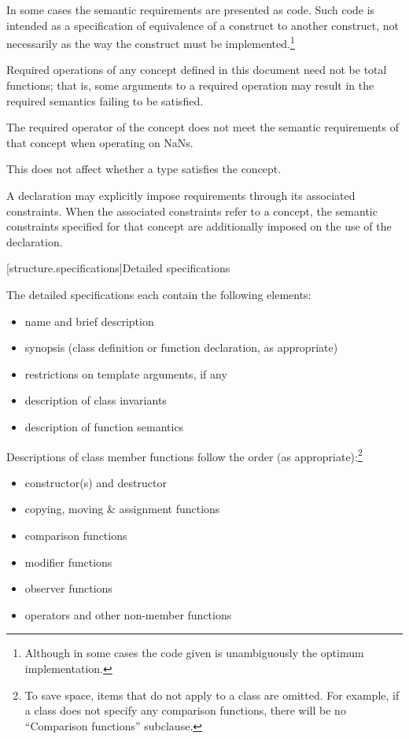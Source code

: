 \pnum
In some cases the semantic requirements are presented as \Cpp{} code.
Such code is intended as a
specification of equivalence of a construct to another construct, not
necessarily as the way the construct
must be implemented.\footnote{Although in some cases the code given is
unambiguously the optimum implementation.}

\pnum
Required operations of any concept defined in this document need not be
total functions; that is, some arguments to a required operation may
result in the required semantics failing to be satisfied.
\begin{example}
The required \tcode{<} operator of the 
concept does not meet the
semantic requirements of that concept when operating on NaNs.
\end{example}
This does not affect whether a type satisfies the concept.

\pnum
A declaration may explicitly impose requirements through its associated
constraints. When the associated constraints refer to a
concept, the semantic constraints specified for that concept
are additionally imposed on the use of the declaration.

[structure.specifications]{Detailed specifications}

\pnum
The detailed specifications each contain the following elements:%

\begin{itemize}
\item name and brief description
\item synopsis (class definition or function declaration, as appropriate)
\item restrictions on template arguments, if any
\item description of class invariants
\item description of function semantics
\end{itemize}

\pnum
Descriptions of class member functions follow the order (as
appropriate):\footnote{To save space, items that do not apply to a class are omitted.
For example, if a class does not specify any comparison functions, there
will be no ``Comparison functions'' subclause.}

\begin{itemize}
\item constructor(s) and destructor
\item copying, moving \& assignment functions
\item comparison functions
\item modifier functions
\item observer functions
\item operators and other non-member functions
\end{itemize}

